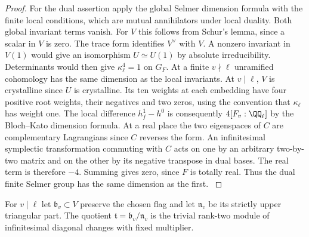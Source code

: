 \documentclass[a4paper,11pt]{article}
\theoremstyle{definition}
\theoremstyle{remark}
\numberwithin{equation}{section}
\begin{document}
\begin{proof}
For the dual assertion apply the global Selmer dimension formula
with the finite local conditions, which are mutual annihilators
under local duality. Both global invariant terms vanish.
For \(V\) this follows from Schur's lemma, since a scalar in
\(V\) is zero. The trace form identifies \(V^\vee\) with \(V\).
A nonzero invariant in \(V(1)\) would give an isomorphism
\(U\simeq U(1)\) by absolute irreducibility. Determinants would
then give \(\kappa_\ell^4=1\) on \(G_F\).
At a finite \(v\nmid\ell\) unramified cohomology has the same
dimension as the local invariants. At \(v\mid\ell\), \(V\) is
crystalline since \(U\) is crystalline. Its ten weights at each
embedding have four positive root weights, their negatives and
two zeros, using the convention that \(\kappa_\ell\) has weight
one. The local difference \(h^1_f-h^0\) is consequently
\(4[F_v:\QQ_\ell]\) by the Bloch--Kato dimension formula. At a
real place the two eigenspaces of \(C\) are complementary
Lagrangians since \(C\) reverses the form. An infinitesimal
symplectic transformation commuting with \(C\) acts on one by
an arbitrary two-by-two matrix and on the other by its negative
transpose in dual bases. The real term is therefore \(-4\).
Summing gives zero, since \(F\) is totally real. Thus the dual
finite Selmer group has the same dimension as the first.
\cite{XII-IX-VI-bk117,XII-IX-V-milne98}
\end{proof}

For \(v\mid\ell\) let \(\mathfrak b_v\subset V\) preserve the
chosen flag and let \(\mathfrak n_v\) be its strictly upper
triangular part. The quotient \(\mathfrak t=\mathfrak b_v/
\mathfrak n_v\) is the trivial rank-two module of infinitesimal
diagonal changes with fixed multiplier.
\end{document}
